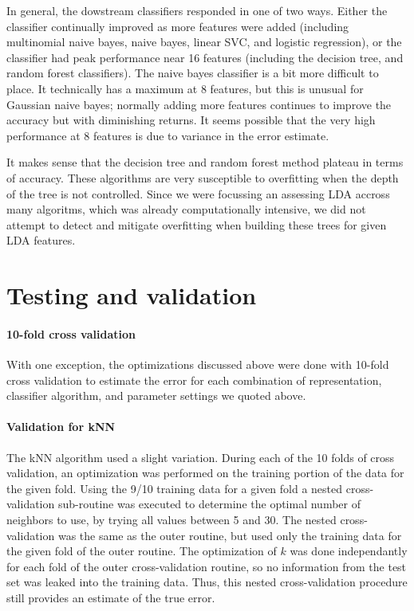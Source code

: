 \documentclass[conference,letterpaper]{IEEEtran}
\begin{document}
In general, the dowstream classifiers responded in one of two ways.  Either
the classifier continually improved as more features were added
(including multinomial naive bayes, naive bayes, linear SVC, and logistic 
regression), or the classifier had peak performance near 16 features 
(including the decision tree, and random forest classifiers).  The naive bayes
classifier is a bit more difficult to place.  It technically has a maximum at
8 features, but this is unusual for Gaussian naive bayes; normally adding
more features continues to improve the accuracy but with diminishing returns.  
It seems possible that the very high performance at 8 features is due to 
variance in the error estimate.

It makes sense that the decision tree and random forest method plateau
in terms of accuracy.  These algorithms are very susceptible to overfitting
when the depth of the tree is not controlled.  Since we were focussing an 
assessing LDA accross many algoritms, which was already computationally 
intensive, we did not attempt to detect and mitigate overfitting when building
these trees for given LDA features.

\section{Testing and validation}
\paragraph*{10-fold cross validation} 
With one exception, the optimizations discussed above were done with 
10-fold cross validation to estimate the error for each combination of 
representation, classifier algorithm, and parameter settings we quoted above.

\paragraph*{Validation for kNN}
The kNN algorithm used a slight variation.  During each of the 10 folds of
cross validation, an optimization was performed on the training portion of
the data for the given fold.  Using the 9/10 training data for a given fold
a nested cross-validation sub-routine was executed to determine the optimal 
number of neighbors to use, by trying all values between 5 and 30.  
The nested cross-validation was the same as the outer routine, but used only
the training data for the given fold of the outer routine.  
The optimization of $k$ was done independantly for each fold of the outer
cross-validation routine, so no information from the test set was leaked into
the training data.  Thus, this nested cross-validation procedure still
provides an estimate of the true error.
\end{document}
